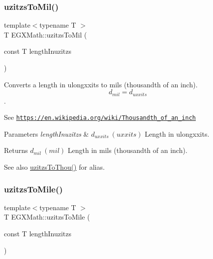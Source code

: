\subsubsection{\texorpdfstring{uzitzs\+To\+Mil()}{uzitzsToMil()}}
{\footnotesize\ttfamily template$<$typename T $>$ \\
T E\+G\+X\+Math\+::uzitzs\+To\+Mil (\begin{DoxyParamCaption}\item[{const T}]{length\+Inuzitzs }\end{DoxyParamCaption})}



Converts a length in ulongxxits to mils (thousandth of an inch). \[ d_{mil}=d_{uxxits} \]. 

See \href{https://en.wikipedia.org/wiki/Thousandth_of_an_inch}{\tt https\+://en.\+wikipedia.\+org/wiki/\+Thousandth\+\_\+of\+\_\+an\+\_\+inch} 
\begin{DoxyParams}{Parameters}
{\em length\+Inuzitzs} & $ d_{uxxits}\ (uxxits)$ Length in ulongxxits. \\
\hline
\end{DoxyParams}
\begin{DoxyReturn}{Returns}
$ d_{mil}\ (mil)$ Length in mils (thousandth of an inch). 
\end{DoxyReturn}
\begin{DoxySeeAlso}{See also}
\mbox{\hyperlink{group___e_g_x_math-_conversions-_length_conversions-uzitzs-_imperial_gaa11694f9026bf30e29bd716a35c05b4e}{uzitzs\+To\+Thou()}} for alias. 
\end{DoxySeeAlso}
\mbox{\label{group___e_g_x_math-_conversions-_length_conversions-uzitzs-_imperial_ga3396c913e6937eee49337db8fac05ca7}} 
\subsubsection{\texorpdfstring{uzitzs\+To\+Mile()}{uzitzsToMile()}}
{\footnotesize\ttfamily template$<$typename T $>$ \\
T E\+G\+X\+Math\+::uzitzs\+To\+Mile (\begin{DoxyParamCaption}\item[{const T}]{length\+Inuzitzs }\end{DoxyParamCaption})}




